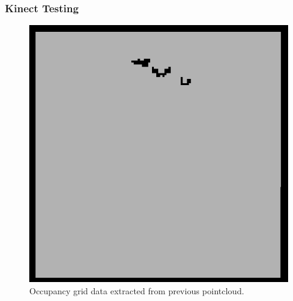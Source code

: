 \documentclass{beamer}
\begin{document}
\begin{frame}
 \frametitle{Kinect Testing}
 \begin{figure}
  \centering
  \includegraphics[scale=0.35]{group_occupancy.png}
  \caption{Occupancy grid data extracted from previous pointcloud.}
 \end{figure}
\end{frame}
\end{document}
